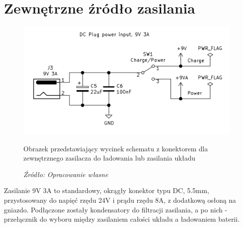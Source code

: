 \documentclass[12pt,a4paper,oneside]{memoir}
\begin{document}
\section{Zewnętrzne źródło zasilania}
\begin{figure}[!h]
	\centering
	\includegraphics[scale=0.3]{images/sch/sch-03.png}
	{\tytulyrozdzialow \footnotesize \caption[Schemat - konektor zewnętrznego ładowania/zasilania] {Obrazek przedstawiający wycinek schematu z konektorem dla zewnętrznego zasilacza do ładowania lub zasilania układu }}
	\caption*{\textit{Źródło: Opracowanie własne}}
\end{figure}
\par Zasilanie 9V 3A to standardowy, okrągły konektor typu DC, 5.5mm, przystosowany do napięć rzędu 24V i prądu rzędu 8A, z dodatkową osłoną na gniazdo. Podłączone zostały kondensatory do filtracji zasilania, a po nich - przełącznik do wyboru między zasilaniem całości układu a ładowaniem baterii.
\newpage
\end{document}
